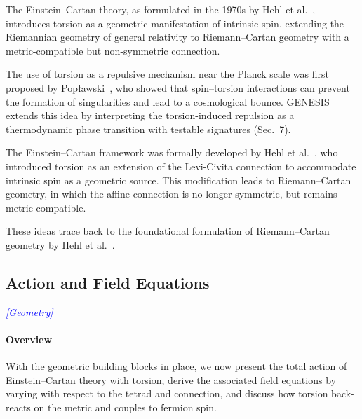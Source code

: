\documentclass{article}
\newcommand{\geometrytag}{\textcolor{blue}{\textit{[Geometry]}}}
\begin{document}
\medskip
\begin{center}
\end{center}
\medskip


The Einstein–Cartan theory, as formulated in the 1970s by Hehl et al.~\cite{hehl1976}, introduces torsion as a geometric manifestation of intrinsic spin, extending the Riemannian geometry of general relativity to Riemann–Cartan geometry with a metric-compatible but non-symmetric connection.


The use of torsion as a repulsive mechanism near the Planck scale was first proposed by Popławski~\cite{Poplawski2010}, who showed that spin–torsion interactions can prevent the formation of singularities and lead to a cosmological bounce.
GENESIS extends this idea by interpreting the torsion-induced repulsion as a thermodynamic phase transition with testable signatures (Sec.~7).


The Einstein–Cartan framework was formally developed by Hehl et al.~\cite{hehl1976}, who introduced torsion as an extension of the Levi-Civita connection to accommodate intrinsic spin as a geometric source. This modification leads to Riemann–Cartan geometry, in which the affine connection is no longer symmetric, but remains metric-compatible.

These ideas trace back to the foundational formulation of Riemann–Cartan geometry by Hehl et al.~\cite{Hehl1995}.


\subsection{Action and Field Equations}
\label{sec:ec-action}
\geometrytag

\paragraph{Overview}
With the geometric building blocks in place, we now present the total action of Einstein–Cartan theory with torsion, derive the associated field equations by varying with respect to the tetrad and connection, and discuss how torsion back-reacts on the metric and couples to fermion spin.
\end{document}
